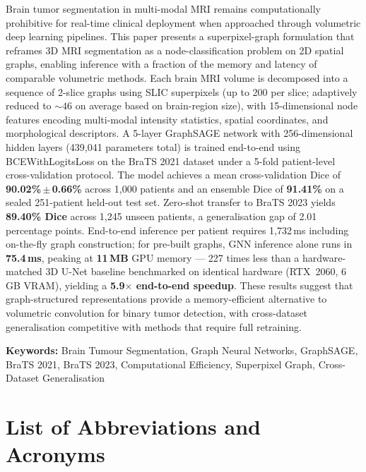 \documentclass{article}
\begin{document}
Brain tumor segmentation in multi-modal MRI remains computationally prohibitive for
real-time clinical deployment when approached through volumetric deep learning
pipelines. This paper presents a superpixel-graph formulation that reframes 3D MRI
segmentation as a node-classification problem on 2D spatial graphs, enabling
inference with a fraction of the memory and latency of comparable volumetric methods.
Each brain MRI volume is decomposed into a sequence of 2-slice graphs using SLIC
superpixels (up to 200 per slice; adaptively reduced to ${\sim}46$ on average based
on brain-region size), with 15-dimensional node features encoding multi-modal
intensity statistics, spatial coordinates, and morphological descriptors. A 5-layer
GraphSAGE network with 256-dimensional hidden layers (439,041 parameters total) is
trained end-to-end using BCEWithLogitsLoss on the BraTS 2021 dataset under a
5-fold patient-level cross-validation protocol. The model achieves a mean
cross-validation Dice of \textbf{90.02\%\,$\pm$\,0.66\%} across 1,000 patients and
an ensemble Dice of \textbf{91.41\%} on a sealed 251-patient held-out test set.
Zero-shot transfer to BraTS 2023 yields \textbf{89.40\% Dice} across 1,245 unseen
patients, a generalisation gap of 2.01 percentage points. End-to-end inference per
patient requires 1,732\,ms including on-the-fly graph construction; for pre-built
graphs, GNN inference alone runs in \textbf{75.4\,ms}, peaking at \textbf{11\,MB}
GPU memory --- 227 times less than a hardware-matched 3D U-Net baseline
benchmarked on identical hardware (RTX~2060, 6\,GB VRAM), yielding a
\textbf{5.9$\times$ end-to-end speedup}. These results suggest that
graph-structured representations provide a memory-efficient alternative to volumetric
convolution for binary tumor detection, with cross-dataset generalisation competitive
with methods that require full retraining.

\vspace{4mm}
\noindent\textbf{Keywords:} Brain Tumour Segmentation, Graph Neural Networks,
GraphSAGE, BraTS 2021, BraTS 2023, Computational Efficiency, Superpixel Graph,
Cross-Dataset Generalisation

\cleardoublepage

\section*{List of Abbreviations and Acronyms}
\end{document}
